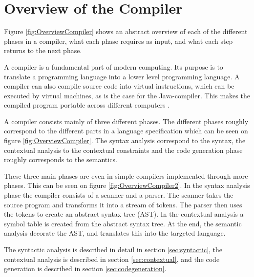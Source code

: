 \section{Overview of the Compiler}
\label{sec:OverviewCompiler}
Figure \ref{fig:OverviewCompiler} shows an abstract overview of each of the different phases in a compiler, what each phase requires as input, and what each step returns to the next phase.

A compiler is a fundamental part of modern computing. Its purpose is to translate a programming language into a lower level programming language. A compiler can also compile source code into virtual instructions, which can be executed by virtual machines, as is the case for the Java-compiler. This makes the compiled program portable across different computers \citep{CraftingACompiler}.

A compiler consists mainly of three different phases. The different phases roughly correspond to the different parts in a language specification which can be seen on figure \ref{fig:OverviewCompiler}. The syntax analysis correspond to the syntax, the contextual analysis to the contextual constraints and the code generation phase roughly corresponds to the semantics.

These three main phases are even in simple compilers implemented through more phases. This can be seen on figure \ref{fig:OverviewCompiler2}. In the syntax analysis phase the compiler consists of a scanner and a parser. The scanner takes the source program and transforms it into a stream of tokens. The parser then uses the tokens to create an abstract syntax tree (AST). In the contextual analysis a symbol table is created from the abstract syntax tree. At the end, the semantic analysis decorate the AST, and translates this into the targeted language.

The syntactic analysis is described in detail in section \ref{sec:syntactic}, the contextual analysis is described in section \ref{sec:contextual}, and the code generation is described in section \ref{sec:codegeneration}.


